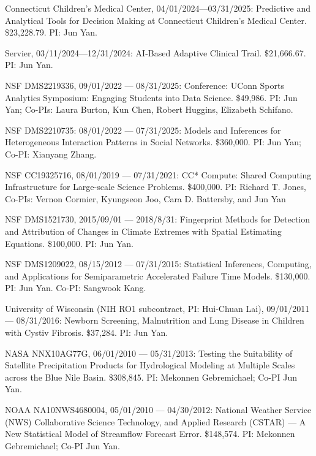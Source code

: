 \documentclass[Statistics]{vita}
\begin{document}
\begin{vita}
  \begin{Grants}
    \begin{External}
    \item Connecticut Children's Medical Center, 04/01/2024---03/31/2025: Predictive and Analytical Tools for Decision Making at Connecticut Children’s Medical Center. \$23,228.79. PI: Jun Yan.
    \item Servier, 03/11/2024---12/31/2024: AI-Based Adaptive Clinical Trail. \$21,666.67.  PI: Jun Yan.
    \item NSF DMS2219336, 09/01/2022 --- 08/31/2025: Conference: UConn Sports Analytics Symposium: Engaging Students into Data Science. \$49,986. PI: Jun Yan; Co-PIs: Laura Burton, Kun Chen,  Robert Huggins, Elizabeth Schifano.
    \item NSF DMS2210735: 08/01/2022 --- 07/31/2025: Models and Inferences for Heterogeneous Interaction Patterns in Social Networks. \$360,000. PI: Jun Yan; Co-PI: Xianyang Zhang.
    \item NSF CC19325716, 08/01/2019 --- 07/31/2021: CC* Compute: Shared Computing Infrastructure for Large-scale Science Problems. \$400,000. PI:  Richard T. Jones, Co-PIs: Vernon Cormier, Kyungseon Joo, Cara D. Battersby, and Jun Yan
    \item NSF DMS1521730, 2015/09/01 --- 2018/8/31: Fingerprint Methods for Detection and Attribution of Changes in Climate Extremes with Spatial Estimating Equations. \$100,000. PI: Jun Yan.
    \item NSF DMS1209022, 08/15/2012 --- 07/31/2015: Statistical Inferences, Computing, and Applications for Semiparametric Accelerated Failure Time Models. \$130,000. PI: Jun Yan. Co-PI: Sangwook Kang.
    \item University of Wisconsin (NIH RO1 subcontract, PI: Hui-Chuan Lai), 09/01/2011 --- 08/31/2016: Newborn Screening, Malnutrition and Lung Disease in Children with Cystiv Fibrosis. \$37,284. PI: Jun Yan.
    \item NASA NNX10AG77G, 06/01/2010 --- 05/31/2013: Testing the Suitability of Satellite Precipitation Products for Hydrological Modeling at Multiple Scales across the Blue Nile Basin. \$308,845. PI: Mekonnen Gebremichael; Co-PI Jun Yan.
    \item NOAA NA10NWS4680004, 05/01/2010 --- 04/30/2012: National Weather Service (NWS) Collaborative Science Technology, and Applied Research (CSTAR) --- A New Statistical Model of Streamflow Forecast Error. \$148,574. PI: Mekonnen Gebremichael; Co-PI Jun Yan.

\end{External}
\end{Grants}
\end{vita}
\end{document}
